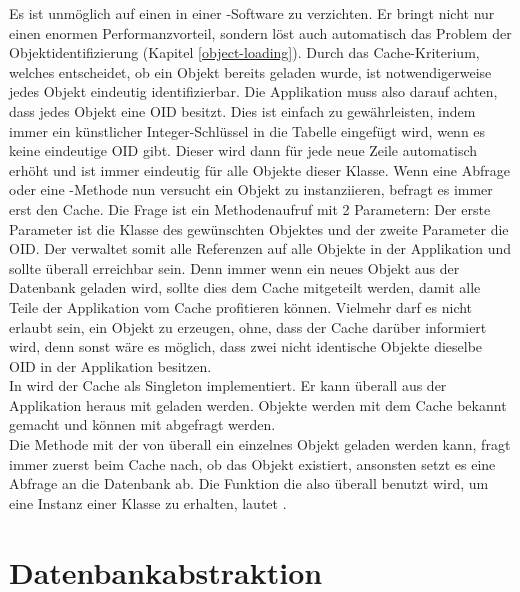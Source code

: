Es ist unmöglich auf einen \objectcache in einer \ORM-Software zu verzichten. Er bringt nicht nur einen enormen Performanzvorteil, sondern löst auch automatisch das Problem der Ob\-jekt\-iden\-ti\-fi\-zie\-rung (Kapitel \ref{object-loading}). Durch das Cache-Kriterium, welches entscheidet, ob ein Objekt bereits geladen wurde, ist notwendigerweise jedes Objekt eindeutig identifizierbar. Die Applikation muss also darauf achten, dass jedes Objekt eine OID besitzt. Dies ist einfach zu gewährleisten, indem immer ein künstlicher Integer-Schlüssel in die Tabelle eingefügt wird, wenn es keine eindeutige OID gibt. Dieser wird dann für jede neue Zeile automatisch erhöht und ist immer eindeutig für alle Objekte dieser Klasse. Wenn eine Abfrage oder eine -Methode nun versucht ein Objekt zu instanziieren, befragt es immer erst den Cache. Die Frage ist ein Methodenaufruf mit 2 Parametern: Der erste Parameter ist die Klasse des gewünschten Objektes und der zweite Parameter die OID. Der \objectcache verwaltet somit alle Referenzen auf alle Objekte in der Applikation und sollte überall erreichbar sein. Denn immer wenn ein neues Objekt aus der Datenbank geladen wird, sollte dies dem Cache mitgeteilt werden, damit alle Teile der Applikation vom Cache profitieren können. Vielmehr darf es nicht erlaubt sein, ein Objekt zu erzeugen, ohne, dass der Cache darüber informiert wird, denn sonst wäre es möglich, dass zwei nicht identische Objekte dieselbe OID in der Applikation besitzen. \\
In \PSCORM wird der Cache als Singleton implementiert. Er kann überall aus der Applikation heraus mit  geladen werden. Objekte werden mit  dem Cache bekannt gemacht und können mit  abgefragt werden. \\
Die Methode mit der von überall ein einzelnes Objekt geladen werden kann, fragt immer zuerst beim Cache nach, ob das Objekt existiert, ansonsten setzt es eine Abfrage an die Datenbank ab. Die Funktion die also überall benutzt wird, um eine Instanz einer Klasse zu erhalten, lautet . \\

\section{Datenbankabstraktion}

